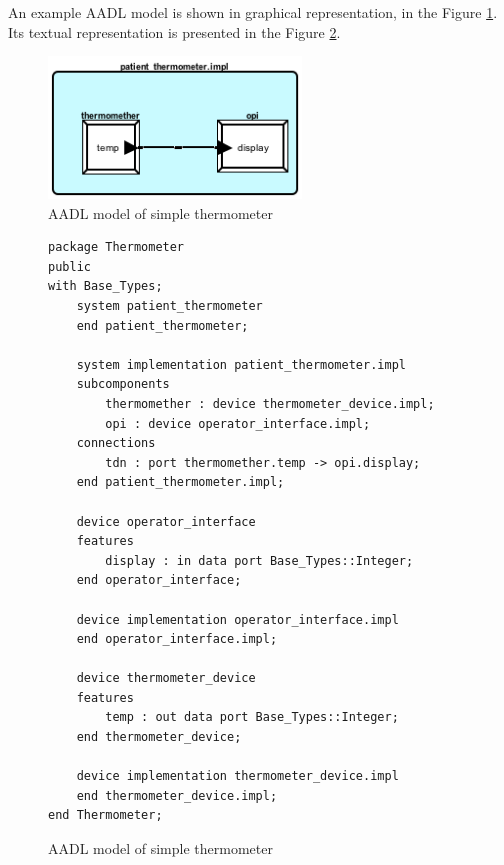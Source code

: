 An example AADL model is shown in graphical representation, in the Figure \ref{figure:patient_thermometer}. Its textual representation is presented in the Figure \ref{listing:patient_thermometer}.

\begin{figure}[ht]%
    \begin{center}
    	\includegraphics[width=0.6\textwidth]{figures/patient_thermometer.png}    	
    \end{center}
    \caption{AADL model of simple thermometer}
    \label{figure:patient_thermometer}
\end{figure}

\begin{figure}
\singlespacing
\begin{lstlisting}[language=aadl, frame=single, gobble=0]
package Thermometer
public
with Base_Types;
	system patient_thermometer
	end patient_thermometer;

	system implementation patient_thermometer.impl
	subcomponents
		thermomether : device thermometer_device.impl;
		opi : device operator_interface.impl;
	connections
		tdn : port thermomether.temp -> opi.display;
	end patient_thermometer.impl;

	device operator_interface
	features
		display : in data port Base_Types::Integer;
	end operator_interface;

	device implementation operator_interface.impl
	end operator_interface.impl;

	device thermometer_device
	features
		temp : out data port Base_Types::Integer;
	end thermometer_device;

	device implementation thermometer_device.impl
	end thermometer_device.impl;
end Thermometer;
\end{lstlisting} 
\doublespacing
\caption{AADL model of simple thermometer}
\label{listing:patient_thermometer}
\end{figure}

